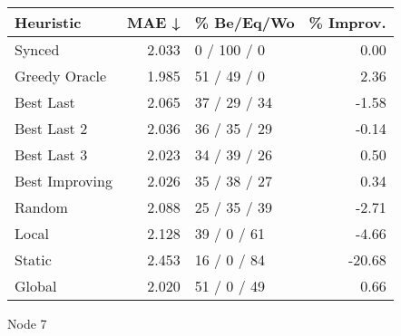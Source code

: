 \begin{tabular}{lrlr}
\toprule
\textbf{Heuristic} & \textbf{MAE ↓} & \textbf{\% Be/Eq/Wo} & \textbf{\% Improv.} \\
\midrule
            Synced &          2.033 &          0 / 100 / 0 &                0.00 \\
     Greedy Oracle &          1.985 &          51 / 49 / 0 &                2.36 \\
         Best Last &          2.065 &         37 / 29 / 34 &               -1.58 \\
       Best Last 2 &          2.036 &         36 / 35 / 29 &               -0.14 \\
       Best Last 3 &          2.023 &         34 / 39 / 26 &                0.50 \\
    Best Improving &          2.026 &         35 / 38 / 27 &                0.34 \\
            Random &          2.088 &         25 / 35 / 39 &               -2.71 \\
             Local &          2.128 &          39 / 0 / 61 &               -4.66 \\
            Static &          2.453 &          16 / 0 / 84 &              -20.68 \\
            Global &          2.020 &          51 / 0 / 49 &                0.66 \\
\bottomrule
\end{tabular}
\caption{Node 7}
\label{tab:hr_non_lr05_le2_bs4_7}
